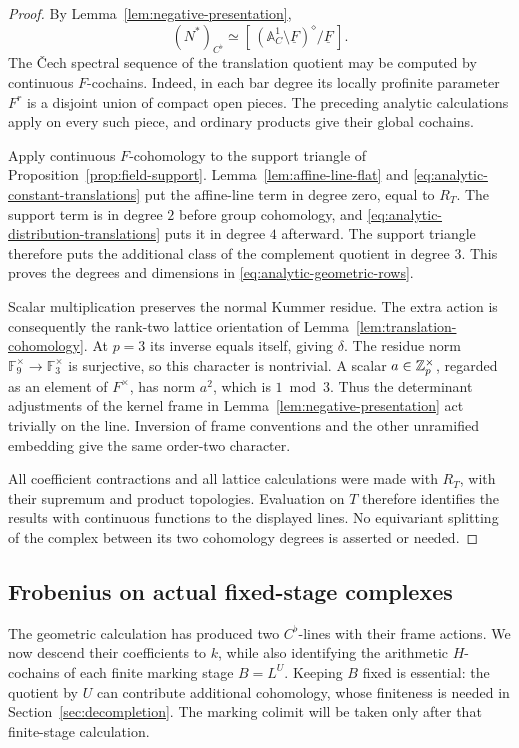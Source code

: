 \begin{proof}
By Lemma~\ref{lem:negative-presentation},
\[
 (N^\ast)_{C^\flat}
 \simeq
 [\,(\mathbb A^1_C\setminus\underline F)^\diamond/
                  \underline F\,].
\]
The \v Cech spectral sequence of the translation quotient may be
computed by continuous \(F\)-cochains.  Indeed, in each bar degree
its locally profinite parameter \(F^r\) is a disjoint union of
compact open pieces.  The preceding analytic calculations apply
on every such piece, and ordinary products give their global
cochains.

Apply continuous \(F\)-cohomology to the support triangle of
Proposition~\ref{prop:field-support}.
Lemma~\ref{lem:affine-line-flat} and
\eqref{eq:analytic-constant-translations} put the affine-line
term in degree zero, equal to \(R_T\).
The support term is in degree \(2\) before group cohomology, and
\eqref{eq:analytic-distribution-translations} puts it in degree
\(4\) afterward.  The support triangle therefore puts the
additional class of the complement quotient in degree \(3\).
This proves the degrees and dimensions in
\eqref{eq:analytic-geometric-rows}.

Scalar multiplication preserves the normal Kummer residue.
The extra action is consequently the rank-two lattice orientation
of Lemma~\ref{lem:translation-cohomology}.
At \(p=3\) its inverse equals itself, giving \(\delta\).
The residue norm \(\mathbb F_9^\times\to\mathbb F_3^\times\) is
surjective, so this character is nontrivial.
A scalar \(a\in\mathbb Z_p^\times\), regarded as an element of \(F^\times\),
has norm \(a^2\), which is \(1\bmod3\).  Thus the determinant
adjustments of the kernel frame in
Lemma~\ref{lem:negative-presentation} act trivially on the line.
Inversion of frame conventions and the other unramified embedding
give the same order-two character.

All coefficient contractions and all lattice calculations were
made with \(R_T\), with their supremum and product topologies.
Evaluation on \(T\) therefore identifies the results with
continuous functions to the displayed lines.  No equivariant
splitting of the complex between its two cohomology degrees is
asserted or needed.
\end{proof}

\subsection{Frobenius on actual fixed-stage complexes}

The geometric calculation has produced two $C^\flat$-lines with their
frame actions.  We now descend their coefficients to $k$, while also
identifying the arithmetic $H$-cochains of each finite marking stage
$B=L^U$.  Keeping $B$ fixed is essential: the quotient by $U$ can
contribute additional cohomology, whose finiteness is needed in
Section~\ref{sec:decompletion}.  The marking colimit will be taken only
after that finite-stage calculation.

